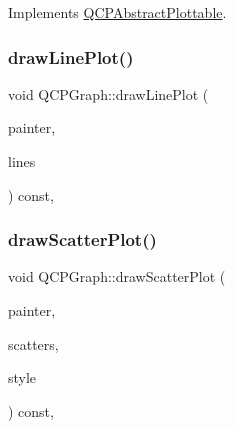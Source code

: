 Implements \mbox{\hyperlink{class_q_c_p_abstract_plottable_a9a450783fd9ed539e589999fd390cdf7}{Q\+C\+P\+Abstract\+Plottable}}.

\mbox{\label{class_q_c_p_graph_a4c3edacb2a11064bf2e16b322156aeda}} 
\subsubsection{\texorpdfstring{drawLinePlot()}{drawLinePlot()}}
{\footnotesize\ttfamily void Q\+C\+P\+Graph\+::draw\+Line\+Plot (\begin{DoxyParamCaption}\item[{\mbox{\hyperlink{class_q_c_p_painter}{Q\+C\+P\+Painter}} $\ast$}]{painter,  }\item[{const Q\+Vector$<$ Q\+PointF $>$ \&}]{lines }\end{DoxyParamCaption}) const\hspace{0.3cm}{\ttfamily [protected]}, {\ttfamily [virtual]}}

\mbox{\label{class_q_c_p_graph_abeb0bbe81026c024bf3d508d13cf5e0e}} 
\subsubsection{\texorpdfstring{drawScatterPlot()}{drawScatterPlot()}}
{\footnotesize\ttfamily void Q\+C\+P\+Graph\+::draw\+Scatter\+Plot (\begin{DoxyParamCaption}\item[{\mbox{\hyperlink{class_q_c_p_painter}{Q\+C\+P\+Painter}} $\ast$}]{painter,  }\item[{const Q\+Vector$<$ Q\+PointF $>$ \&}]{scatters,  }\item[{const \mbox{\hyperlink{class_q_c_p_scatter_style}{Q\+C\+P\+Scatter\+Style}} \&}]{style }\end{DoxyParamCaption}) const\hspace{0.3cm}{\ttfamily [protected]}, {\ttfamily [virtual]}}

\mbox{\label{class_q_c_p_graph_aaabd6c6a7200a2672c44e62bd2a1cafa}} 
